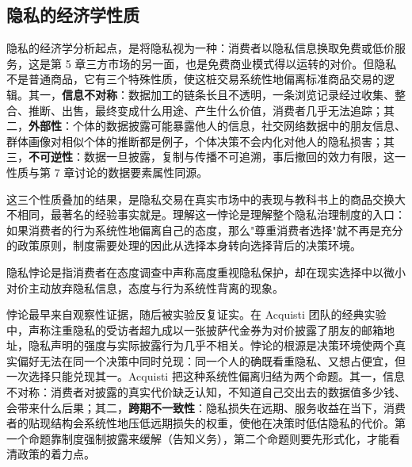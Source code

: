 \subsection{隐私的经济学性质}

隐私的经济学分析起点，是将隐私视为一种：消费者以隐私信息换取免费或低价服务，这是第 5 章三方市场的另一面，也是免费商业模式得以运转的对价。但隐私不是普通商品，它有三个特殊性质，使这桩交易系统性地偏离标准商品交易的逻辑。其一，\textbf{信息不对称}：数据加工的链条长且不透明，一条浏览记录经过收集、整合、推断、出售，最终变成什么用途、产生什么价值，消费者几乎无法追踪；其二，\textbf{外部性}：个体的数据披露可能暴露他人的信息，社交网络数据中的朋友信息、群体画像对相似个体的推断都是例子，个体决策不会内化对他人的隐私损害；其三，\textbf{不可逆性}：数据一旦披露，复制与传播不可追溯，事后撤回的效力有限，这一性质与第 7 章讨论的数据要素属性同源。

这三个性质叠加的结果，是隐私交易在真实市场中的表现与教科书上的商品交换大不相同，最著名的经验事实就是。理解这一悖论是理解整个隐私治理制度的入口：如果消费者的行为系统性地偏离自己的态度，那么"尊重消费者选择"就不再是充分的政策原则，制度需要处理的因此从选择本身转向选择背后的决策环境。

\begin{definition}
隐私悖论是指消费者在态度调查中声称高度重视隐私保护，却在现实选择中以微小对价主动放弃隐私信息，态度与行为系统性背离的现象。
\end{definition}

悖论最早来自观察性证据，随后被实验反复证实。在 Acquisti 团队的经典实验中，声称注重隐私的受访者超九成以一张披萨代金券为对价披露了朋友的邮箱地址，隐私声明的强度与实际披露行为几乎不相关。悖论的根源是决策环境使两个真实偏好无法在同一个决策中同时兑现：同一个人的确既看重隐私、又想占便宜，但一次选择只能兑现其一。Acquisti 把这种系统性偏离归结为两个命题。其一，信息不对称：消费者对披露的真实代价缺乏认知，不知道自己交出去的数据值多少钱、会带来什么后果；其二，\textbf{跨期不一致性}：隐私损失在远期、服务收益在当下，消费者的贴现结构会系统性地压低远期损失的权重，使他在决策时低估隐私的代价。第一个命题靠制度强制披露来缓解（告知义务），第二个命题则要先形式化，才能看清政策的着力点。

